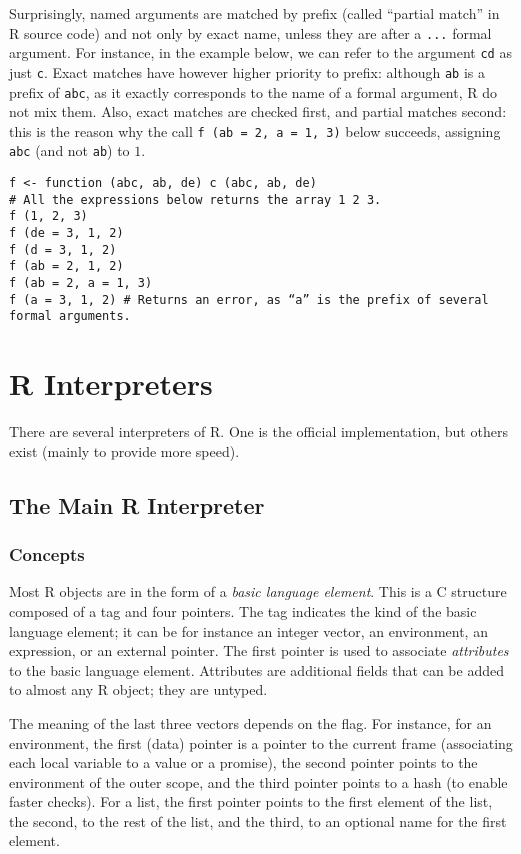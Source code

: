 \documentclass{article}
\newcommand\R{R}
\newcommand\Cn{C}
\begin{document}
Surprisingly, named arguments are matched by prefix
(called “partial match” in \R{} source code) and not only by exact name,
unless they are after a \texttt{...} formal argument.
For instance, in the example below,
we can refer to the argument \texttt{cd} as just \texttt{c}.
Exact matches have however higher priority to prefix:
although \texttt{ab} is a prefix of \texttt{abc},
as it exactly corresponds to the name of a formal argument,
\R{} do not mix them.
Also, exact matches are checked first, and partial matches second:
this is the reason why the call \texttt{f (ab = 2, a = 1, 3)}
below succeeds, assigning \texttt{abc}
(and not \texttt{ab}) to \(1\).
\begin{verbatim}
f <- function (abc, ab, de) c (abc, ab, de)
# All the expressions below returns the array 1 2 3.
f (1, 2, 3)
f (de = 3, 1, 2)
f (d = 3, 1, 2)
f (ab = 2, 1, 2)
f (ab = 2, a = 1, 3)
f (a = 3, 1, 2) # Returns an error, as “a” is the prefix of several formal arguments.
\end{verbatim}


\section{\R{} Interpreters}

There are several interpreters of \R{}.
One is the official implementation,
but others exist (mainly to provide more speed).

\subsection{The Main \R{} Interpreter}

\subsubsection{Concepts}
\label{sec:concepts}

Most \R{} objects are in the form of a \emph{basic language element}.
This is a \Cn{} structure composed of a tag and four pointers.
The tag indicates the kind of the basic language element;
it can be for instance an integer vector, an environment, an expression, or an external pointer.
The first pointer is used to associate \emph{attributes} to the basic language element.
Attributes are additional fields that can be added to almost any \R{} object;
they are untyped.

The meaning of the last three vectors depends on the flag.
%
For instance, for an environment, the first (data) pointer is a pointer
to the current frame (associating each local variable to a value or a promise),
the second pointer points to the environment of the outer scope,
and the third pointer points to a hash (to enable faster checks).
%
For a list, the first pointer points to the first element of the list,
the second, to the rest of the list,
and the third, to an optional name for the first element.
\end{document}
